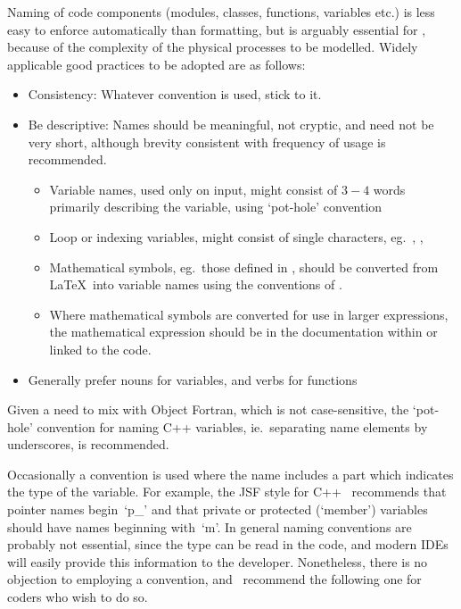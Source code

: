 \begin{enumerate}
Naming of code components (modules, classes, functions, variables
etc.) is less easy to enforce automatically than formatting, but is
arguably essential for \nep, because of the complexity of the physical
processes to be modelled.
Widely applicable good practices to be adopted are as follows:
\begin{itemize}
\item Consistency: Whatever convention is used, stick to it.
\item Be descriptive: Names should be meaningful, not cryptic, and need
not be very short, although brevity consistent with frequency of usage
is recommended.
\begin{itemize}
\item Variable names, used only on input, might consist of $3-4$ words primarily describing
the variable, using `pot-hole' convention
\item Loop or indexing variables, might consist of single characters, eg.\ , , 
\item Mathematical symbols, eg.\ those defined in , should be converted 
from \LaTeX \ into variable names using the conventions of .
\item Where mathematical symbols are converted for use in larger expressions, 
the mathematical expression
should be in the documentation within or linked to  the code.
\end{itemize}
\item Generally prefer nouns for variables, and verbs for functions
\end{itemize}
Given a need to mix with Object Fortran, which is not case-sensitive,
the `pot-hole' convention for naming C++ variables, ie.\ separating
name elements by underscores, is recommended.

Occasionally a convention is used where the name includes a part which
indicates the type of the variable. For example, the JSF style for C++~\cite[\S\,6.6]{pittwhitely}
recommends that pointer names begin~`p\_' and that private or protected (`member') variables
should have names beginning with~`m'.
In general naming conventions are probably not
essential, since the type can be read in the code, and modern IDEs will
easily provide this information to the developer.
Nonetheless, there is no objection to employing a convention, and \nep \
recommend the following one for coders who wish to do so.


\end{enumerate}
